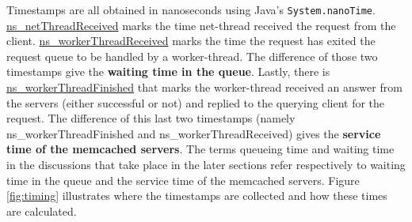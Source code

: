 \documentclass[11pt,a4paper]{article}
\begin{document}
\par Timestamps are all obtained in nanoseconds using Java's \texttt{System.nanoTime}. \underline{ns\_netThreadReceived} marks the time net-thread received the request from the client. \underline{ns\_workerThreadReceived} marks the time the request has exited the request queue to be handled by a worker-thread. The difference of those two timestamps give the \textbf{waiting time in the queue}. Lastly, there is \underline{ns\_workerThreadFinished} that marks the worker-thread received an answer from the servers (either successful or not) and replied to the querying client for the request. The difference of this last two timestamps (namely ns\_workerThreadFinished and ns\_workerThreadReceived) gives the \textbf{service time of the memcached servers}. The terms queueing time and waiting time in the discussions that take place in the later sections refer respectively to waiting time in the queue and the service time of the memcached servers. Figure \ref{fig:timing} illustrates where the timestamps are collected and how these times are calculated.
\end{document}

